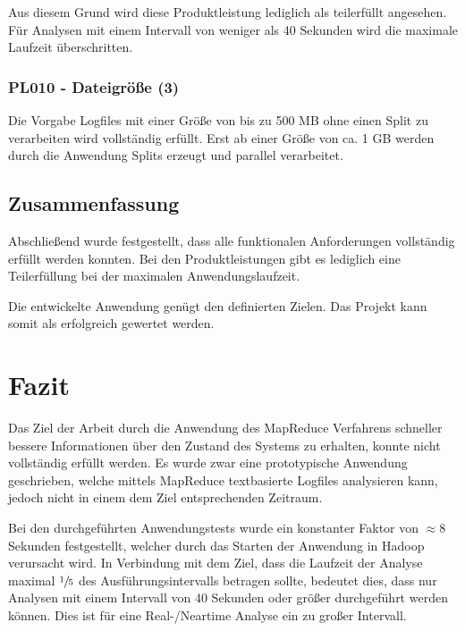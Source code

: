 Aus diesem Grund wird diese Produktleistung lediglich als teilerfüllt angesehen. Für Analysen mit einem Intervall von weniger als 40 Sekunden wird die maximale Laufzeit überschritten.

\subsubsection{PL010 - Dateigröße (3)}
Die Vorgabe Logfiles mit einer Größe von bis zu 500 \ac{MB} ohne einen Split zu verarbeiten wird vollständig erfüllt. Erst ab einer Größe von ca. 1 \ac{GB} werden durch die Anwendung Splits erzeugt und parallel verarbeitet. 

\subsection{Zusammenfassung}
Abschließend wurde festgestellt, dass alle funktionalen Anforderungen vollständig erfüllt werden konnten. Bei den Produktleistungen gibt es lediglich eine Teilerfüllung bei der maximalen Anwendungslaufzeit.

Die entwickelte Anwendung genügt den definierten Zielen. Das Projekt kann somit als erfolgreich gewertet werden. 



\newpage
\section{Fazit}\label{sec:Fazit}
Das Ziel der Arbeit durch die Anwendung des MapReduce Verfahrens schneller bessere Informationen über den Zustand des Systems zu erhalten, konnte nicht vollständig erfüllt werden. Es wurde zwar eine prototypische Anwendung geschrieben, welche mittels MapReduce textbasierte Logfiles analysieren kann, jedoch nicht in einem dem Ziel entsprechenden Zeitraum.

Bei den durchgeführten Anwendungstests wurde ein konstanter Faktor von $\approx 8$ Sekunden festgestellt, welcher durch das Starten der Anwendung in Hadoop verursacht wird. In Verbindung mit dem Ziel, dass die Laufzeit der Analyse maximal $\sfrac{1}{5}$ des Ausführungsintervalls betragen sollte, bedeutet dies, dass nur Analysen mit einem Intervall von 40 Sekunden oder größer durchgeführt werden können. Dies ist für eine Real-/Neartime Analyse ein zu großer Intervall.

